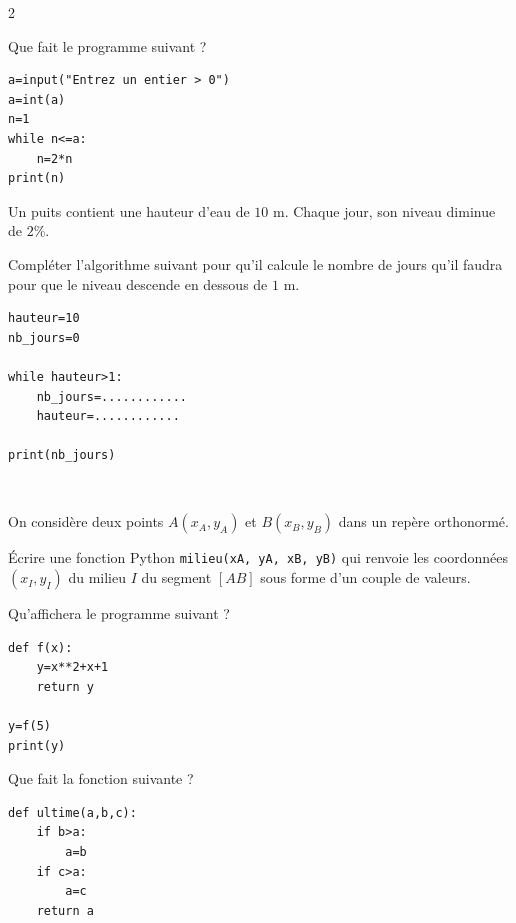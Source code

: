 {\begin{multicols}{2}
	  \begin{exo}{}
		  Que fait le programme suivant ?

		  \begin{lstlisting}
a=input("Entrez un entier > 0")
a=int(a)
n=1
while n<=a:
    n=2*n
print(n)
\end{lstlisting}
	  \end{exo}

	  \begin{exo}{}
		  Un puits contient une hauteur d'eau de $10$ m. Chaque jour, son niveau diminue de $2$\%.

		  Compléter l'algorithme suivant pour qu'il calcule le nombre de jours qu'il faudra pour que le niveau descende en dessous de $1$ m.

		  \begin{lstlisting}
hauteur=10
nb_jours=0

while hauteur>1:
    nb_jours=............
    hauteur=............

print(nb_jours)
\end{lstlisting}
	  \end{exo}

	  \vfill~\columnbreak

	  \begin{exo}
		  On considère deux points $A(x_A, y_A)$ et $B(x_B, y_B)$ dans un repère orthonormé.

		  Écrire une fonction Python \lstinline|milieu(xA, yA, xB, yB)| qui renvoie les coordonnées $(x_I, y_I)$ du milieu $I$ du segment $[AB]$ sous forme d'un couple de valeurs.
	  \end{exo}

	  \begin{exo}{}
		  Qu'affichera le programme suivant ?

		  \begin{lstlisting}
def f(x):
    y=x**2+x+1
    return y

y=f(5)
print(y)
\end{lstlisting}
	  \end{exo}

	  \begin{exo}{}
		  Que fait la fonction suivante ?

		  \begin{lstlisting}
def ultime(a,b,c):
    if b>a:
        a=b
    if c>a:
        a=c
    return a
\end{lstlisting}
	  \end{exo}


\end{multicols}}

